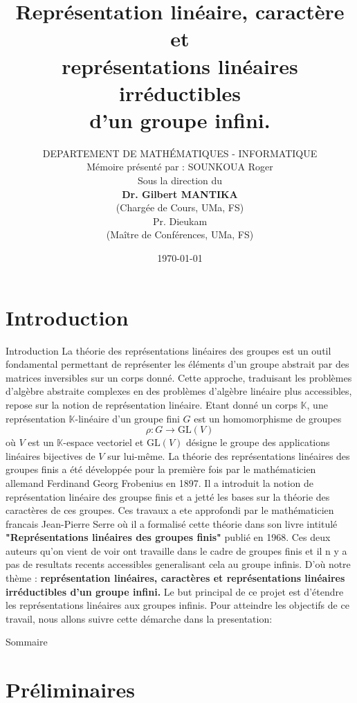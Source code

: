 \documentclass[9pt]{beamer}
\title{Représentation linéaire, caractère et \\ 
	représentations linéaires irréductibles \\ 
	d’un groupe infini.}
\author[SOUNKOUA Roger]{DEPARTEMENT DE MATHÉMATIQUES - INFORMATIQUE \\
	 Mémoire présenté par : SOUNKOUA Roger \\
Sous la direction du \\
\textbf{Dr. Gilbert MANTIKA}\\
(Chargée de Cours, UMa, FS)\\
Pr. Dieukam \\
(Maître de Conférences, UMa, FS)
}
\date{\today}
\begin{document}
	
	
	
	
	\begin{frame}
		\titlepage
	\end{frame}
	

	
	\section*{Introduction}
	\begin{frame}{Introduction}
La théorie des représentations linéaires des groupes est un outil fondamental permettant de représenter les éléments d’un groupe abstrait par des matrices inversibles sur un corps donné. Cette approche, traduisant les problèmes d’algèbre abstraite complexes en des problèmes d’algèbre linéaire plus accessibles, repose sur la notion de représentation linéaire. Etant donné un corps $\mathbb{K}$, une représentation $\mathbb{K}$-linéaire d’un groupe fini $G$ est un homomorphisme de groupes \[ \rho : G \to \text{GL}(V) \]
où $V$ est un $\mathbb{K}$-espace vectoriel et $\text{GL}(V)$ désigne le groupe des applications linéaires bijectives de $V$ sur lui-même. 
La théorie des représentations linéaires des groupes finis a été développée pour la première fois par le mathématicien allemand Ferdinand Georg Frobenius en 1897. Il a introduit la notion de représentation linéaire des groupse finis et a jetté les bases sur la théorie des caractères de ces groupes. Ces travaux a ete approfondi par le mathématicien francais Jean-Pierre Serre où il a formalisé cette théorie dans son livre intitulé \textbf{"Représentations linéaires des groupes finis"} publié en 1968. Ces deux auteurs qu'on vient de voir ont travaille dans le cadre de groupes finis et il n y a pas de resultats recents accessibles generalisant cela au groupe infinis. D'où notre thème : \textbf{représentation linéaires, caractères et représentations linéaires irréductibles d'un groupe infini.}
Le but principal de ce projet est d’étendre les représentations linéaires aux groupes infinis. Pour atteindre les objectifs de ce travail, nous allons suivre cette démarche dans la presentation:
	\end{frame}
	

\begin{frame}{Sommaire}
	\tableofcontents
\end{frame}
	
	
	\section{Préliminaires}
	
\end{document}
